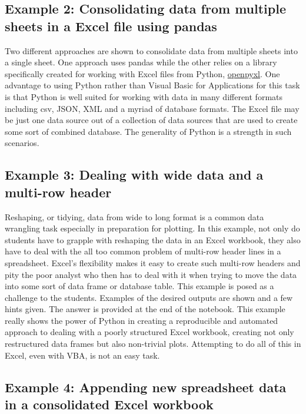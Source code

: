 \documentclass[ited,blindrev]{informs3}              %
\begin{document}
\subsection{Example 2: Consolidating data from multiple sheets in a Excel file using pandas}

Two different approaches are shown to consolidate data from multiple sheets into a single sheet. One approach uses pandas while the other relies on a library specifically created for working with Excel files from Python, \href{https://openpyxl.readthedocs.io/en/stable/}{openpyxl}. One advantage to using Python rather than Visual Basic for Applications for this task is that Python is well suited for working with data in many different formats including csv, JSON, XML and a myriad of database formats. The Excel file may be just one data source out of a collection of data sources that are used to create some sort of combined database. The generality of Python is a strength in such scenarios.

\subsection{Example 3: Dealing with wide data and a multi-row header}

Reshaping, or tidying, data \citep{wickhamTidyData2014} from wide to long format is a common data wrangling task especially in preparation for plotting. In this example, not only do students have to grapple with reshaping the data in an Excel workbook, they also have to deal with the all too common problem of multi-row header lines in a spreadsheet. Excel's flexibility makes it easy to create such multi-row headers and pity the poor analyst who then has to deal with it when trying to move the data into some sort of data frame or database table. This example is posed as a challenge to the students. Examples of the desired outputs are shown and a few hints given. The answer is provided at the end of the notebook. This example really shows the power of Python in creating a reproducible and automated approach to dealing with a poorly structured Excel workbook, creating not only restructured data frames but also non-trivial plots. Attempting to do all of this in Excel, even with VBA, is not an easy task.

\subsection{Example 4: Appending new spreadsheet data in a consolidated Excel workbook}
\end{document}
